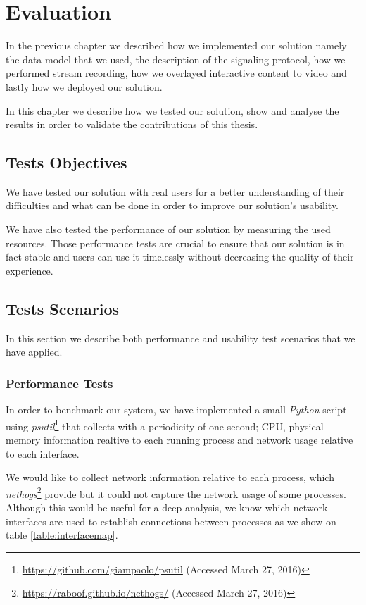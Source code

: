 \chapter{Evaluation}
\label{chapter:evaluation}
  In the previous chapter we described how we implemented our solution namely the data model that we used, the description of the signaling protocol, how we performed stream recording, how we overlayed interactive content to video and lastly how we deployed our solution. 

  In this chapter we describe how we tested our solution, show and analyse the results in order to validate the contributions of this thesis.

\section{Tests Objectives}

  We have tested our solution with real users for a better understanding of their difficulties and what can be done in order to improve our solution's usability.

  We have also tested the performance of our solution by measuring the used resources. Those performance tests are crucial to ensure that our solution is in fact stable and users can use it timelessly without decreasing the quality of their experience. 


\section{Tests Scenarios}

  In this section we describe both performance and usability test scenarios that we have applied.

  \subsection {Performance Tests}
      In order to benchmark our system, we have implemented a small \emph{Python} script using \emph{psutil}\footnote{\url{https://github.com/giampaolo/psutil} (Accessed March 27, 2016)} that collects with a periodicity of one second; CPU, physical memory information realtive to each running process and network usage relative to each interface. 

      We would like to collect network information relative to each process, which \emph{nethogs}\footnote{\url{https://raboof.github.io/nethogs/} (Accessed March 27, 2016)} provide but it could not capture the network usage of some processes. Although this would be useful for a deep analysis, we know which network interfaces are used to establish connections between processes as we show on table \ref{table:interfacemap}.

